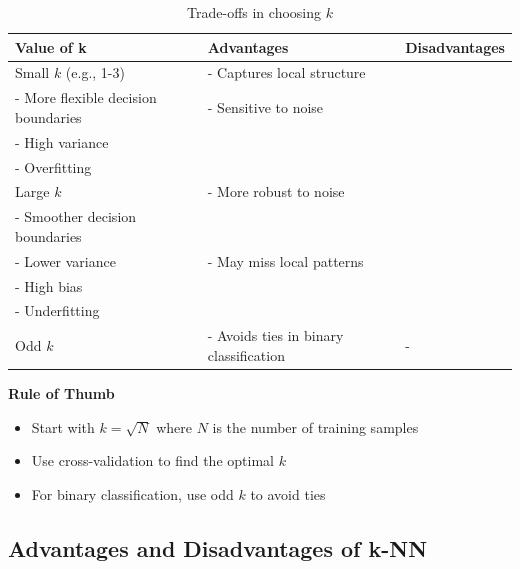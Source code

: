 \documentclass[11pt,a4paper]{article}
\theoremstyle{definition}
\theoremstyle{plain}
\theoremstyle{remark}
\begin{document}
\begin{table}[h]
\centering
\begin{tabular}{|p{3cm}|p{5cm}|p{5cm}|}
\hline
\textbf{Value of k} & \textbf{Advantages} & \textbf{Disadvantages} \\
\hline
Small $k$ (e.g., 1-3) & 
- Captures local structure\\
- More flexible decision boundaries & 
- Sensitive to noise\\
- High variance\\
- Overfitting \\
\hline
Large $k$ & 
- More robust to noise\\
- Smoother decision boundaries\\
- Lower variance & 
- May miss local patterns\\
- High bias\\
- Underfitting \\
\hline
Odd $k$ & 
- Avoids ties in binary classification & 
- \\
\hline
\end{tabular}
\caption{Trade-offs in choosing $k$}
\end{table}

\begin{center}
\colorbox{yellow!20}{\parbox{0.9\textwidth}{
\textbf{Rule of Thumb}\\[0.2cm]
\begin{itemize}
    \item Start with $k = \sqrt{N}$ where $N$ is the number of training samples
    \item Use cross-validation to find the optimal $k$
    \item For binary classification, use odd $k$ to avoid ties
\end{itemize}
}}
\end{center}

\subsection{Advantages and Disadvantages of k-NN}
\end{document}
